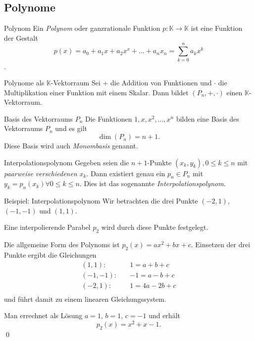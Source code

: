 \documentclass[german]{spicker}
\begin{document}
\newpage
\subsection{Polynome}
\begin{defi}{Polynom}
    Ein \emph{Polynom} oder ganzrationale Funktion $p : \mathbb{K} \to \mathbb{K}$ ist eine Funktion der Gestalt
    $$
        p(x) = a_0 + a_1x + a_2x^x + \ldots + a_nx_n = \sum^n_{k=0} a_kx^k
    $$.
\end{defi}

\begin{bonus}{Polynome als $\mathbb{K}$-Vektorraum}
    Sei $+$ die Addition von Funktionen und $\cdot$ die Multiplikation einer Funktion mit einem Skalar. Dann bildet $(P_n, +, \cdot)$ einen $\mathbb{K}$-Vektorraum.
\end{bonus}

\begin{bonus}{Basis des Vektorraums $P_n$}
    Die Funktionen $1, x, x^2, \ldots, x^n$ bilden eine Basis des Vektorraums $P_n$ und es gilt
    $$
        \dim(P_n) = n + 1.
    $$
    Diese Basis wird auch \emph{Monombasis} genannt.
\end{bonus}

\begin{defi}{Interpolationspolynom}
    Gegeben seien die $n+1$-Punkte $(x_k, y_k), 0 \leq k \leq n$ mit \emph{paarweise verschiedenen} $x_k$.
    Dann existiert genau ein $p_n \in P_n$ mit $y_k = p_n(x_k) \forall 0 \leq k \leq n$.
    Dies ist das sogenannte \emph{Interpolationspolynom}.
\end{defi}

\begin{bonus}{Beispiel: Interpolationspolynom}
    Wir betrachten die drei Punkte $(-2, 1)$, $(-1, -1)$ und $(1, 1)$.

    Eine interpolierende Parabel $p_2$ wird durch diese Punkte festgelegt.

    Die allgemeine Form des Polynoms ist $p_2(x) = ax^2 + bx + c$.
    Einsetzen der drei Punkte ergibt die Gleichungen
    $$
        \begin{aligned}
            (1, 1): \quad   & 1 = a + b + c   \\
            (-1, -1): \quad & -1 = a - b + c  \\
            (-2, 1): \quad  & 1 = 4a - 2b + c \\
        \end{aligned}
    $$
    und führt damit zu einem linearen Gleichungssystem.

    Man errechnet als Lösung $a = 1$, $b = 1$, $c = -1$ und erhält
    $$
        p_2(x) = x^2 + x -1.
    $$\qed
\end{bonus}
\end{document}
